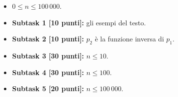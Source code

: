 \Examples
\begin{example}
%
%
%
\end{example}

\Constraints
\begin{itemize}[nolistsep, noitemsep]
  \item $0 \le n \le 100\,000$.
\end{itemize}

\Scoring
\begin{itemize}
  \item \textbf{Subtask 1 [10 punti]:} gli esempi del testo.
  \item \textbf{Subtask 2 [10 punti]:} $p_2$ è la funzione inversa di $p_1$.
  \item \textbf{Subtask 3 [30 punti]:} $n \leq 10$.
  \item \textbf{Subtask 4 [30 punti]:} $n \leq 100$.
  \item \textbf{Subtask 5 [20 punti]:} $n \leq 100\,000$.
\end{itemize}
  
